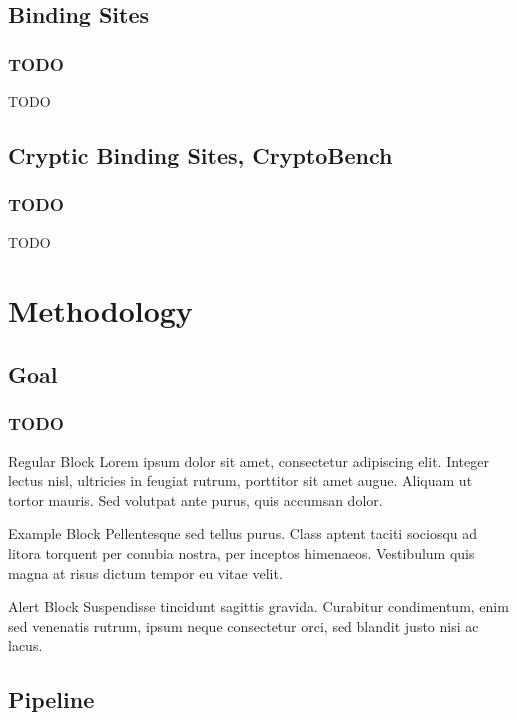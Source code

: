 \documentclass[aspectratio=169]{beamer}
\begin{document}
\subsection{Binding Sites}

\begin{frame}
  \frametitle{TODO}
  TODO

\end{frame}

\subsection{Cryptic Binding Sites, CryptoBench}

\begin{frame}
  \frametitle{TODO}
  TODO

\end{frame}

\section{Methodology}

\subsection{Goal}

\begin{frame}
  \frametitle{TODO}
  \begin{block}{Regular Block}
    Lorem ipsum dolor sit amet, consectetur adipiscing elit. Integer lectus nisl, ultricies in feugiat rutrum, porttitor sit amet augue. Aliquam ut tortor mauris. Sed volutpat ante purus, quis accumsan dolor.
  \end{block}

  \begin{exampleblock}{Example Block}
    Pellentesque sed tellus purus. Class aptent taciti sociosqu ad litora torquent per conubia nostra, per inceptos himenaeos. Vestibulum quis magna at risus dictum tempor eu vitae velit.
  \end{exampleblock}

  \begin{alertblock}{Alert Block}
    Suspendisse tincidunt sagittis gravida. Curabitur condimentum, enim sed venenatis rutrum, ipsum neque consectetur orci, sed blandit justo nisi ac lacus.
  \end{alertblock}
\end{frame}

\subsection{Pipeline}
\end{document}
